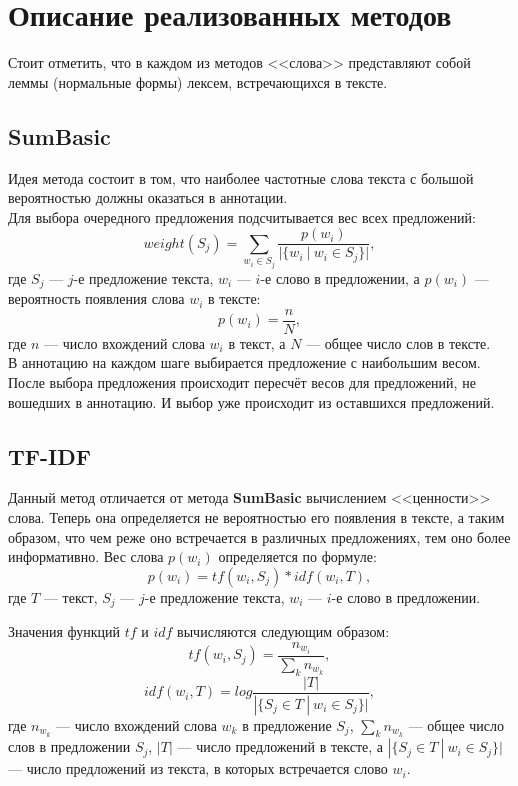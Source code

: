 \documentclass[oneside,final,12pt]{article}
\begin{document}
\section{Описание реализованных методов}

Стоит отметить, что в каждом из методов <<слова>> представляют собой леммы (нормальные формы) лексем, встречающихся в тексте.

\subsection{SumBasic}

Идея метода состоит в том, что наиболее частотные слова текста с большой вероятностью должны оказаться в аннотации.\\

Для выбора очередного предложения подсчитывается вес всех предложений:
$$
weight(S_j) = \sum_{w_i \in S_j} \frac{p(w_i)}{| \{w_i~|~w_i \in S_j\} |},
$$
где $S_j$ --- $j$-е предложение текста, $w_i$ --- $i$-е слово в предложении, а $p(w_i)$ --- вероятность появления слова $w_i$ в тексте:
$$
p(w_i) = \frac{n}{N},
$$
где $n$ --- число вхождений слова $w_i$ в текст, а $N$ --- общее число слов в тексте.\\

В аннотацию на каждом шаге выбирается предложение с наибольшим весом. После выбора предложения происходит пересчёт весов для предложений, не вошедших в аннотацию. И выбор уже происходит из оставшихся предложений.

\subsection{TF-IDF}

Данный метод отличается от метода \textbf{SumBasic} вычислением <<ценности>> слова. Теперь она определяется не вероятностью его появления в тексте, а таким образом, что чем реже оно встречается в различных предложениях, тем оно более информативно. Вес слова $p(w_i)$ определяется по формуле:
$$
p(w_i) = tf(w_i, S_j) * idf(w_i, T),
$$
где $T$ --- текст, $S_j$ --- $j$-е предложение текста, $w_i$ --- $i$-е слово в предложении.
\clearpage

Значения функций $tf$ и $idf$ вычисляются следующим образом:
$$
tf(w_i, S_j) = \frac{n_{w_i}}{\sum_k{n_{w_k}}},
$$
$$
idf(w_i, T) = log \frac{|T|}{| \{S_j \in T~|~w_i \in S_j\} |},
$$
где $n_{w_k}$ --- число вхождений слова $w_k$ в предложение $S_j$, $\sum_k{n_{w_k}}$ --- общее число слов в предложении $S_j$, $|T|$ --- число предложений в тексте, а $| \{S_j \in T~|~w_i \in S_j\} |$ --- число предложений из текста, в которых встречается слово $w_i$.\\
\end{document}
